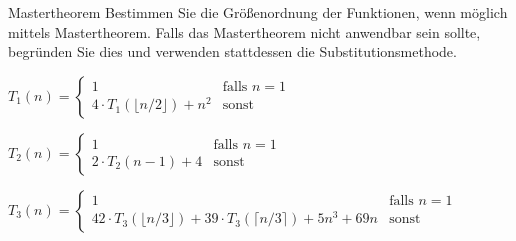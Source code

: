 \documentclass{exercisesheet}
\begin{document}
\begin{eexercises}{Mastertheorem}{
    Bestimmen Sie die Größenordnung der Funktionen, wenn möglich mittels Mastertheorem. Falls das Mastertheorem nicht anwendbar sein sollte, begründen Sie dies und verwenden stattdessen die Substitutionsmethode.
  }
  \item $T_1(n) = \begin{cases}
      1                                      & \text{falls } n = 1 \\
      4 \cdot T_1(\lfloor n/2 \rfloor) + n^2 & \text{sonst}
    \end{cases}$
  \item $T_2(n) = \begin{cases}
      1                    & \text{falls } n = 1 \\
      2 \cdot T_2(n-1) + 4 & \text{sonst}
    \end{cases}$
  \item $T_3(n) = \begin{cases}
      1                                                                                & \text{falls } n = 1 \\
      42 \cdot T_3(\lfloor n/3 \rfloor) + 39 \cdot T_3(\lceil n/3 \rceil) + 5n^3 + 69n & \text{sonst}
    \end{cases}$
\end{eexercises}
\end{document}
